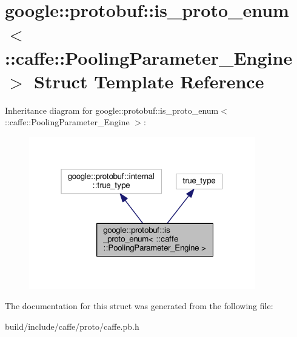 \hypertarget{structgoogle_1_1protobuf_1_1is__proto__enum_3_01_1_1caffe_1_1_pooling_parameter___engine_01_4}{}\section{google\+:\+:protobuf\+:\+:is\+\_\+proto\+\_\+enum$<$ \+:\+:caffe\+:\+:Pooling\+Parameter\+\_\+\+Engine $>$ Struct Template Reference}
\label{structgoogle_1_1protobuf_1_1is__proto__enum_3_01_1_1caffe_1_1_pooling_parameter___engine_01_4}


Inheritance diagram for google\+:\+:protobuf\+:\+:is\+\_\+proto\+\_\+enum$<$ \+:\+:caffe\+:\+:Pooling\+Parameter\+\_\+\+Engine $>$\+:
\nopagebreak
\begin{figure}[H]
\begin{center}
\leavevmode
\includegraphics[width=280pt]{structgoogle_1_1protobuf_1_1is__proto__enum_3_01_1_1caffe_1_1_pooling_parameter___engine_01_4__inherit__graph}
\end{center}
\end{figure}


The documentation for this struct was generated from the following file\+:\begin{DoxyCompactItemize}
\item 
build/include/caffe/proto/caffe.\+pb.\+h\end{DoxyCompactItemize}
